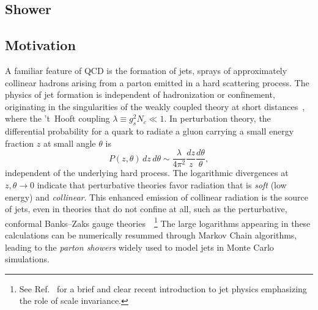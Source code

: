 \begin{enumerate}
\section{Shower}
\label{sec:darkshowershower}

\subsection{Motivation}

A familiar feature of QCD is the formation of jets, sprays of approximately collinear hadrons arising from a parton emitted in a hard scattering process. The physics of jet formation is independent of hadronization or confinement, originating in the singularities of the weakly coupled theory at short distances~\cite{Sterman:1977wj}, where the 't~Hooft coupling $\lambda \equiv g_s^2 N_c \ll 1$. In perturbation theory, the differential probability for a quark to radiate a gluon carrying a small energy fraction $z$ at small angle $\theta$ is
\begin{equation}
\label{eq:scsplit}
  P(z, \theta)\, dz\, d\theta \sim \frac{\lambda}{4\pi^2} \frac{dz}{z} \frac{d\theta}{\theta},
\end{equation}
independent of the underlying hard process. The logarithmic divergences at $z, \theta \to 0$ indicate that perturbative theories favor radiation that is \emph{soft} (low energy) and \emph{collinear}. This enhanced emission of collinear radiation is the source of jets, even in theories that do not confine at all, such as the perturbative, conformal Banks--Zaks gauge theories~\cite{Banks:1981nn}~\footnote{See Ref.~\cite{Larkoski:2017fip} for a brief and clear recent introduction to jet physics emphasizing the role of scale invariance.} The large logarithms appearing in these calculations can be numerically resummed through Markov Chain algorithms, leading to the \emph{parton showers} widely used to model jets in Monte Carlo simulations.


\end{enumerate}
